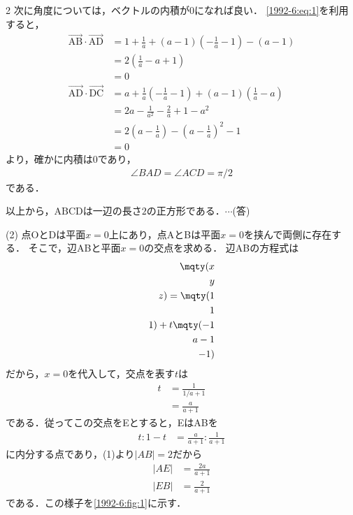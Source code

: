\documentclass[../../../../main.tex]{subfiles}
\begin{document}
\begin{multicols}{2}
  次に角度については，ベクトルの内積が$0$になれば良い．
  \cref{1992-6:eq:1}を利用すると，
  \begin{align*}
    \vec{\text{AB}} \cdot \vec{\text{AD}}
                                          & = 1+\frac{1}{a} + (a-1)\left(-\frac{1}{a}-1\right) -(a-1)                    \\
                                          & = 2\left(\frac{1}{a}-a+1\right)                                              \\
                                          & = 0                                                                          \\
    \vec{\text{AD}} \cdot \vec{\text{DC}} & = a + \frac{1}{a}\left(-\frac{1}{a}-1\right)+(a-1)\left(\frac{1}{a}-a\right) \\
                                          & = 2a - \frac{1}{a^2} - \frac{2}{a} +1 -a^2                                   \\
                                          & = 2\left(a-\frac{1}{a}\right) - \left(a-\frac{1}{a}\right)^2 -1              \\
                                          & = 0
  \end{align*}
  より，確かに内積は$0$であり，
  \begin{align*}
    \angle BAD = \angle ACD = \pi/2
  \end{align*}
  である．

  以上から，$\text{ABCD}$は一辺の長さ$2$の正方形である．$\cdots$(答)

  \vspace{10pt}
  (2)
  点OとDは平面$x=0$上にあり，点AとBは平面$x=0$を挟んで両側に存在する．
  そこで，辺ABと平面$x=0$の交点を求める．
  辺ABの方程式は
  \begin{align*}
    \mqty(x \\ y \\ z) = \mqty(1 \\ 1 \\ 1) + t \mqty(-1 \\ a-1 \\ -1)
  \end{align*}
  だから，$x=0$を代入して，交点を表す$t$は
  \begin{align*}
    t
     & = \frac{1}{1/a+1} \\
     & = \frac{a}{a+1}
  \end{align*}
  である．従ってこの交点をEとすると，EはABを
  \begin{align*}
    t: 1-t & = \frac{a}{a+1}: \frac{1}{a+1}
  \end{align*}
  に内分する点であり，(1)より$|AB|=2$だから
  \begin{align*}
    |AE| & = \frac{2a}{a+1} \\
    |EB| & = \frac{2}{a+1}
  \end{align*}
  である．この様子を\cref{1992-6:fig:1}に示す．


\end{multicols}
\end{document}
